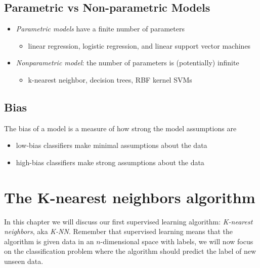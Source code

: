 \documentclass{article}
\begin{document}
\subsection{Parametric vs Non-parametric
Models}\label{parametric-vs-non-parametric-models}

\begin{itemize}
\tightlist
\item
  \emph{Parametric models} have a finite number of parameters

  \begin{itemize}
  \tightlist
  \item
    linear regression, logistic regression, and linear support vector
    machines
  \end{itemize}
\item
  \emph{Nonparametric model}: the number of parameters is (potentially)
  infinite

  \begin{itemize}
  \tightlist
  \item
    k-nearest neighbor, decision trees, RBF kernel SVMs
  \end{itemize}
\end{itemize}

\subsection{Bias}\label{bias}

The bias of a model is a measure of how strong the model assumptions are

\begin{itemize}
\tightlist
\item
  low-bias classifiers make minimal assumptions about the data
\item
  high-bias classifiers make strong assumptions about the data
\end{itemize}

\section{The K-nearest neighbors
algorithm}\label{the-k-nearest-neighbors-algorithm}

In this chapter we will discuss our first supervised learning algorithm:
\emph{K-nearest neighbors}, aka \emph{K-NN}. Remember that supervised
learning means that the algorithm is given data in an \(n\)-dimensional
space with labels, we will now focus on the classification problem where
the algorithm should predict the label of new unseen data.
\end{document}
